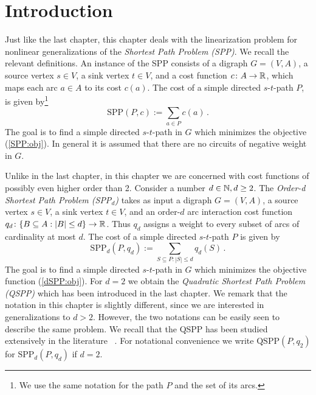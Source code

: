 \section{Introduction}\label{intro:sec}

Just like the last chapter, this chapter deals with the linearization problem for 
nonlinear
generalizations of the  \emph{Shortest Path Problem (SPP)}. We recall the relevant definitions.
An instance of the SPP  consists  of a digraph $G = (V, A)$,  a source vertex $s \in V$, a sink vertex $t \in V$, and a
cost function $c\colon A\to \mathbb{R}$, which maps each arc $a\in A$ to its cost
$c(a)$.  The cost of a simple directed $s$-$t$-path $P$, 
is given by\footnote{We use the same  notation for the path $P$ and the set of its arcs.}
\begin{equation}\label{SPP:obj}  \text{SPP}(P,c):=\sum_{a\in P} c(a)\, .  \end{equation}
The goal  is to find a simple directed 
$s$-$t$-path in $G$ which minimizes the objective 
(\ref{SPP:obj}).
In general it is assumed that 
there are no circuits of negative weight in $G$. 


Unlike in the last chapter, in this chapter we are concerned with cost functions of possibly even higher order than 2. Consider a number $d\in \mathbb{N}, d \geq 2$.  The \emph{Order-d Shortest Path Problem
  (SPP$_d$)}
 takes as input a  digraph $G = (V, A)$,  
  a source vertex $s \in V$, a sink vertex $t \in V$, and an order-$d$ arc interaction 
cost  function $q_d\colon \{ B \subseteq A : |B| \leq d \}
\to \mathbb{R}$. Thus $q_d$ assigns a  weight to every subset of
arcs of cardinality at most $d$.
 The cost of a simple directed $s$-$t$-path $P$ 
is given by
\begin{equation}\label{dSPP:obj}
  \text{SPP}_d(P,q_d):=\sum_{S\subseteq P \colon |S|\le d} q_d(S)\, .\end{equation}
The goal is to find  
a simple directed 
$s$-$t$-path in $G$ which minimizes the objective function (\ref{dSPP:obj}).
For $d=2$ we
obtain the   \emph{Quadratic  Shortest Path Problem (QSPP)} which has been introduced in the last chapter. We remark that the notation in this chapter is slightly different, since we are interested in generalizations to $d > 2$. However, the two notations can be easily seen to describe the same problem. We recall that the QSPP has been studied extensively in the literature
~\cite{cela2021linearizable,huSo2018,huSo2020,rostami2018}. 
For notational convenience we write $\text{QSPP}(P,q_2)$ for $\text{SPP}_d(P,q_d)$ if $d=2$.


